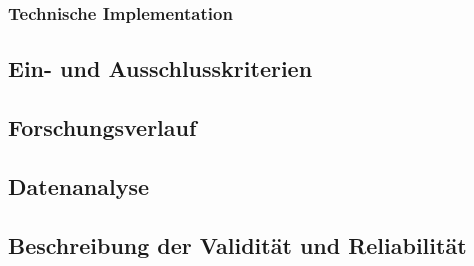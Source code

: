 \subsubsection{Technische Implementation}

\subsection{Ein- und Ausschlusskriterien}

\subsection{Forschungsverlauf}

\subsection{Datenanalyse}

\subsection{Beschreibung der Validität und Reliabilität}